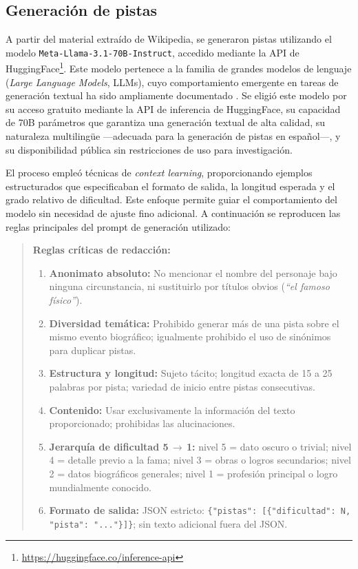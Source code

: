 \documentclass[../main.tex]{subfiles}
\begin{document}
\subsection{Generación de pistas}

A partir del material extraído de Wikipedia, se generaron pistas utilizando el modelo \texttt{Meta-Llama-3.1-70B-Instruct}, accedido mediante la API de HuggingFace\footnote{\url{https://huggingface.co/inference-api}}. Este modelo pertenece a la familia de grandes modelos de lenguaje (\textit{Large Language Models}, LLMs), cuyo comportamiento emergente en tareas de generación textual ha sido ampliamente documentado \cite{brown2020}. Se eligió este modelo por su acceso gratuito mediante la API de inferencia de HuggingFace, su capacidad de 70B parámetros que garantiza una generación textual de alta calidad, su naturaleza multilingüe —adecuada para la generación de pistas en español—, y su disponibilidad pública sin restricciones de uso para investigación.

El proceso empleó técnicas de \textit{context learning}, proporcionando ejemplos estructurados que especificaban el formato de salida, la longitud esperada y el grado relativo de dificultad. Este enfoque permite guiar el comportamiento del modelo sin necesidad de ajuste fino adicional. A continuación se reproducen las reglas principales del prompt de generación utilizado:

\begin{quote}
\textbf{Reglas críticas de redacción:}
\begin{enumerate}
    \item \textbf{Anonimato absoluto:} No mencionar el nombre del personaje bajo ninguna circunstancia, ni sustituirlo por títulos obvios (\textit{``el famoso físico''}).
    \item \textbf{Diversidad temática:} Prohibido generar más de una pista sobre el mismo evento biográfico; igualmente prohibido el uso de sinónimos para duplicar pistas.
    \item \textbf{Estructura y longitud:} Sujeto tácito; longitud exacta de 15 a 25 palabras por pista; variedad de inicio entre pistas consecutivas.
    \item \textbf{Contenido:} Usar exclusivamente la información del texto proporcionado; prohibidas las alucinaciones.
    \item \textbf{Jerarquía de dificultad 5\,$\to$\,1:} nivel 5 = dato oscuro o trivial; nivel 4 = detalle previo a la fama; nivel 3 = obras o logros secundarios; nivel 2 = datos biográficos generales; nivel 1 = profesión principal o logro mundialmente conocido.
    \item \textbf{Formato de salida:} JSON estricto: \texttt{\{"pistas": [\{"dificultad": N, "pista": "..."\}]\}}; sin texto adicional fuera del JSON.
\end{enumerate}
\end{quote}
\end{document}
